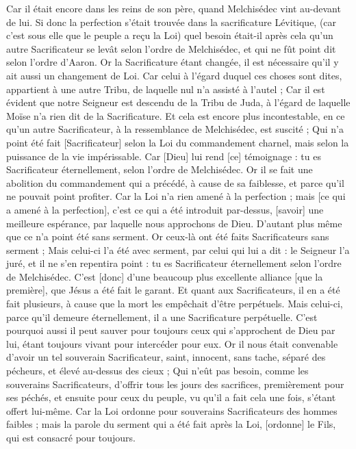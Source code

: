 \begin{multicols}{2}
Car il était encore dans les reins de son père, quand Melchisédec vint au-devant de lui.
Si donc la perfection s'était trouvée dans la sacrificature Lévitique, (car c'est sous elle que le peuple a reçu la Loi) quel besoin était-il après cela qu'un autre Sacrificateur se levât selon l'ordre de Melchisédec, et qui ne fût point dit selon l'ordre d'Aaron.
Or la Sacrificature étant changée, il est nécessaire qu'il y ait aussi un changement de Loi.
Car celui à l'égard duquel ces choses sont dites, appartient à une autre Tribu, de laquelle nul n'a assisté à l'autel ;
Car il est évident que notre Seigneur est descendu de la Tribu de Juda, à l'égard de laquelle Moïse n'a rien dit de la Sacrificature.
Et cela est encore plus incontestable, en ce qu'un autre Sacrificateur, à la ressemblance de Melchisédec, est suscité ;
Qui n'a point été fait [Sacrificateur] selon la Loi du commandement charnel, mais selon la puissance de la vie impérissable.
Car [Dieu] lui rend [ce] témoignage : tu es Sacrificateur éternellement, selon l'ordre de Melchisédec.
Or il se fait une abolition du commandement qui a précédé, à cause de sa faiblesse, et parce qu'il ne pouvait point profiter.
Car la Loi n'a rien amené à la perfection ; mais [ce qui a amené à la perfection], c'est ce qui a été introduit par-dessus, [savoir] une meilleure espérance, par laquelle nous approchons de Dieu.
D'autant plus même que ce n'a point été sans serment. Or ceux-là ont été faits Sacrificateurs sans serment ;
Mais celui-ci l'a été avec serment, par celui qui lui a dit : le Seigneur l'a juré, et il ne s'en repentira point : tu es Sacrificateur éternellement selon l'ordre de Melchisédec.
C'est [donc] d'une beaucoup plus excellente alliance [que la première], que Jésus a été fait le garant.
Et quant aux Sacrificateurs, il en a été fait plusieurs, à cause que la mort les empêchait d'être perpétuels.
Mais celui-ci, parce qu'il demeure éternellement, il a une Sacrificature perpétuelle.
C'est pourquoi aussi il peut sauver pour toujours ceux qui s'approchent de Dieu par lui, étant toujours vivant pour intercéder pour eux.
Or il nous était convenable d'avoir un tel souverain Sacrificateur, saint, innocent, sans tache, séparé des pécheurs, et élevé au-dessus des cieux ;
Qui n'eût pas besoin, comme les souverains Sacrificateurs, d'offrir tous les jours des sacrifices, premièrement pour ses péchés, et ensuite pour ceux du peuple, vu qu'il a fait cela une fois, s'étant offert lui-même.
Car la Loi ordonne pour souverains Sacrificateurs des hommes faibles ; mais la parole du serment qui a été fait après la Loi, [ordonne] le Fils, qui est consacré pour toujours.

\end{multicols}
